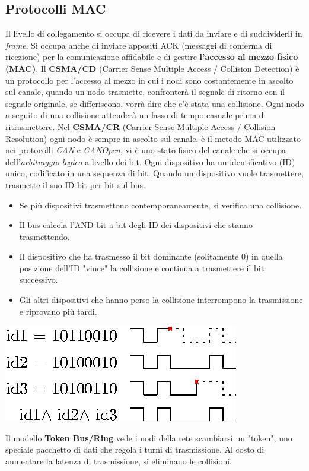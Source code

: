 \documentclass[10pt, letterpaper]{report}
\begin{document}
\subsection{Protocolli MAC}
Il livello di collegamento si occupa di ricevere i dati da inviare e di suddividerli in \textit{frame}. Si occupa anche di inviare appositi ACK (messaggi di conferma di ricezione) per la comunicazione affidabile e di gestire \textbf{l'accesso al mezzo fisico (MAC)}.\acc 
Il \textbf{CSMA/CD} (Carrier Sense Multiple Access / Collision Detection) è un protocollo per l'accesso al mezzo in cui i nodi sono costantemente in ascolto sul canale, quando un nodo trasmette, confronterà il segnale di ritorno con il segnale originale, se differiscono, vorrà dire che c'è stata una collisione. Ogni nodo a seguito di una collisione attenderà un lasso di tempo casuale prima di ritrasmettere.\acc 
Nel \textbf{CSMA/CR}   (Carrier Sense Multiple Access / Collision Resolution) ogni nodo è sempre in ascolto sul canale, è il metodo MAC utilizzato nei protocolli \textit{CAN} e \textit{CANOpen}, vi è uno stato fisico del canale che si occupa dell'\textit{arbitraggio logico} a livello dei bit.
Ogni dispositivo ha un identificativo (ID) unico, codificato in una sequenza di bit. Quando un dispositivo vuole trasmettere, trasmette il suo ID bit per bit sul bus.\begin{itemize}
    \item Se più dispositivi trasmettono contemporaneamente, si verifica una collisione.
    \item Il bus calcola l'AND bit a bit degli ID dei dispositivi che stanno trasmettendo.
    \item Il dispositivo che ha trasmesso il bit dominante (solitamente 0) in quella posizione dell'ID "vince" la collisione e continua a trasmettere il bit successivo.
    \item Gli altri dispositivi che hanno perso la collisione interrompono la trasmissione e riprovano più tardi.
\end{itemize}\begin{center}
    \includegraphics[width=0.5 \textwidth ]{images/collisionRes.eps}
\end{center}
Il modello \textbf{Token Bus/Ring} vede i nodi della rete scambiarsi un "token", uno speciale pacchetto di dati che regola i turni di trasmissione. Al costo di aumentare la latenza di trasmissione, si eliminano le collisioni.\acc 
\end{document}
